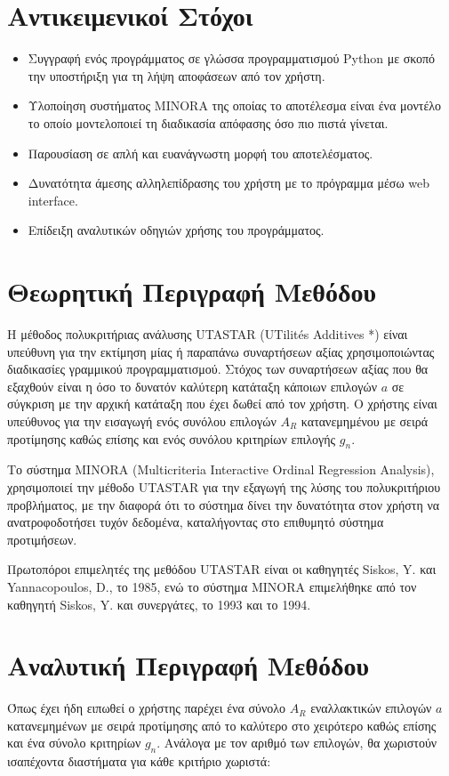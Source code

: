 \documentclass[11pt,a4paper,titlepage]{article}
\numberwithin{equation}{section}
\begin{document}
\section{Αντικειμενικοί Στόχοι}
\label{sec:1}   
\begin{itemize}
	\item Συγγραφή ενός προγράμματος σε γλώσσα προγραμματισμού Python με σκοπό την υποστήριξη για τη λήψη αποφάσεων από τον χρήστη.
	\item Υλοποίηση συστήματος MINORA της οποίας το αποτέλεσμα είναι ένα μοντέλο το οποίο μοντελοποιεί τη διαδικασία απόφασης όσο πιο πιστά γίνεται.
	\item Παρουσίαση σε απλή και ευανάγνωστη μορφή του αποτελέσματος.
	\item Δυνατότητα άμεσης αλληλεπίδρασης του χρήστη με το πρόγραμμα μέσω web interface.
	\item Επίδειξη αναλυτικών οδηγιών χρήσης του προγράμματος.
\end{itemize}


\section{Θεωρητική Περιγραφή Μεθόδου}
\label{sec:2}
Η μέθοδος πολυκριτήριας ανάλυσης UTASTAR (UTilités Additives *) είναι υπεύθυνη για την εκτίμηση μίας ή παραπάνω συναρτήσεων αξίας χρησιμοποιώντας διαδικασίες γραμμικού προγραμματισμού. Στόχος των συναρτήσεων αξίας που θα εξαχθούν είναι η όσο το δυνατόν καλύτερη κατάταξη κάποιων επιλογών $a$ σε σύγκριση με την αρχική κατάταξη που έχει δωθεί από τον χρήστη. Ο χρήστης είναι υπεύθυνος για την εισαγωγή ενός συνόλου επιλογών $A_{R}$ κατανεμημένου με σειρά προτίμησης καθώς επίσης και ενός συνόλου κριτηρίων επιλογής $g_{n}$. 

Το σύστημα MINORA (Multicriteria Interactive Ordinal Regression Analysis), χρησιμοποιεί την μέθοδο UTASTAR για την εξαγωγή της λύσης του πολυκριτήριου προβλήματος, με την διαφορά ότι το σύστημα δίνει την δυνατότητα στον χρήστη να ανατροφοδοτήσει τυχόν δεδομένα, καταλήγοντας στο επιθυμητό σύστημα προτιμήσεων.

Πρωτοπόροι επιμελητές της μεθόδου UTASTAR είναι οι καθηγητές Siskos, Y. και Yannacopoulos, D., το 1985, ενώ το σύστημα MINORA επιμελήθηκε από τον καθηγητή Siskos, Y. και συνεργάτες, το 1993 και το 1994. 

\newpage

\section{Αναλυτική Περιγραφή Μεθόδου}
\label{sec:3}
Όπως έχει ήδη ειπωθεί ο χρήστης παρέχει ένα σύνολο $A_{R}$ εναλλακτικών επιλογών $a$ κατανεμημένων με σειρά προτίμησης από το καλύτερο στο χειρότερο καθώς επίσης και ένα σύνολο κριτηρίων $g_{n}$. Ανάλογα με τον αριθμό των επιλογών, θα χωριστούν ισαπέχοντα διαστήματα για κάθε κριτήριο χωριστά: 
\end{document}
